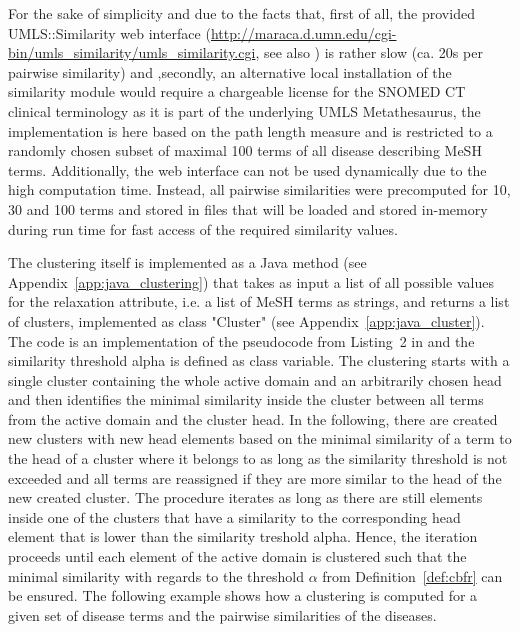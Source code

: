 
For the sake of simplicity and due to the facts that, first of all, the provided UMLS::Similarity web interface
(\url{http://maraca.d.umn.edu/cgi-bin/umls_similarity/umls_similarity.cgi}, see also \citep{UMLS::Sim}) is rather slow (ca. 20s per pairwise similarity) and
,secondly, an alternative local installation of the similarity module \citep{McInnes2009} would require a chargeable license for the SNOMED CT clinical 
terminology as it is part of the underlying UMLS Metathesaurus, the implementation is here based on the path length measure and is restricted to a randomly
chosen subset of maximal 100 terms of all disease describing MeSH terms. Additionally, the web interface can not be used dynamically due to the high
computation time. Instead, all pairwise similarities were precomputed for 10, 30 and 100 terms and stored in files that will be loaded and stored in-memory 
during run time for fast access of the required similarity values.

The clustering itself is implemented as a Java method (see Appendix~\ref{app:java_clustering}) that takes as input a list of all possible values for the
relaxation attribute, i.e. a list of MeSH terms as strings, and returns a list of clusters, implemented as class "Cluster" (see
Appendix~\ref{app:java_cluster}). The code is an implementation of the pseudocode from Listing~2 in \cite{Wiese2014} and the similarity threshold alpha is
defined as class variable. The clustering starts with a single cluster containing the whole active domain and an arbitrarily chosen head and then identifies
the minimal similarity inside the cluster between all terms from the active domain and the cluster head. In the following, there are created new clusters with 
new head elements based on the minimal similarity of a term to the head of a cluster where it belongs to as long as the similarity threshold is not exceeded 
and all terms are reassigned if they are more similar to the head of the new created cluster. The procedure iterates as long as there are still elements inside
one of the clusters that have a similarity to the corresponding head element that is lower than the similarity treshold alpha. Hence, the iteration proceeds
until each element of the active domain is clustered such that the minimal similarity with regards to the threshold $\alpha$ from Definition~\ref{def:cbfr}
can be ensured. The following example shows how a clustering is computed for a given set of disease terms and the pairwise similarities of the diseases.

